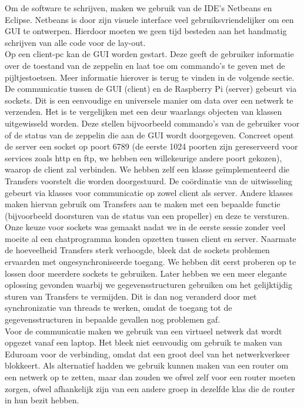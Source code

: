 \documentclass[eind]{penoverslag}
\begin{document}
Om de software te schrijven, maken we gebruik van de IDE's Netbeans en Eclipse. Netbeans is door zijn visuele interface veel gebruiksvriendelijker om een GUI te ontwerpen. Hierdoor moeten we geen tijd besteden aan het handmatig schrijven van alle code voor de lay-out. \\

Op een client-pc kan de GUI worden gestart. Deze geeft de gebruiker informatie over de toestand van de zeppelin en laat toe om commando's te geven met de pijltjestoetsen. Meer informatie hierover is terug te vinden in de volgende sectie. \\

De communicatie tussen de GUI (client) en de Raspberry Pi (server) gebeurt via sockets. Dit is een eenvoudige en universele manier om data over een netwerk te verzenden. Het is te vergelijken met een deur waarlangs objecten van klassen uitgewisseld worden. Deze stellen bijvoorbeeld commando's van de gebruiker voor of de status van de zeppelin die aan de GUI wordt doorgegeven. Concreet opent de server een socket op poort 6789 (de eerste 1024 poorten zijn gereserveerd voor services zoals http en ftp, we hebben een willekeurige andere poort gekozen), waarop de client zal verbinden. We hebben zelf een klasse ge\"implementeerd die Transfers voorstelt die worden doorgestuurd. De co\"ordinatie van de uitwisseling gebeurt via klasses voor communicatie op zowel client als server. Andere klasses maken hiervan gebruik om Transfers aan te maken met een bepaalde functie (bijvoorbeeld doorsturen van de status van een propeller) en deze te versturen. \\

Onze keuze voor sockets was gemaakt nadat we in de eerste sessie zonder veel moeite al een chatprogramma konden opzetten tussen client en server. Naarmate de hoeveelheid Transfers sterk verhoogde, bleek dat de sockets problemen ervaarden met ongesynchroniseerde toegang. We hebben dit eerst proberen op te lossen door meerdere sockets te gebruiken. Later hebben we een meer elegante oplossing gevonden waarbij we gegevensstructuren gebruiken om het gelijktijdig sturen van Transfers te vermijden. Dit is dan nog veranderd door met synchronizatie van threads te werken, omdat de toegang tot de gegevensstructuren in bepaalde gevallen nog problemen gaf. \\

Voor de communicatie maken we gebruik van een virtueel netwerk dat wordt opgezet vanaf een laptop. Het bleek niet eenvoudig om gebruik te maken van Eduroam voor de verbinding, omdat dat een groot deel van het netwerkverkeer blokkeert. Als alternatief hadden we gebruik kunnen maken van een router om een netwerk op te zetten, maar dan zouden we ofwel zelf voor een router moeten zorgen, ofwel afhankelijk zijn van een andere groep in dezelfde klas die de router in hun bezit hebben. \\
\end{document}
